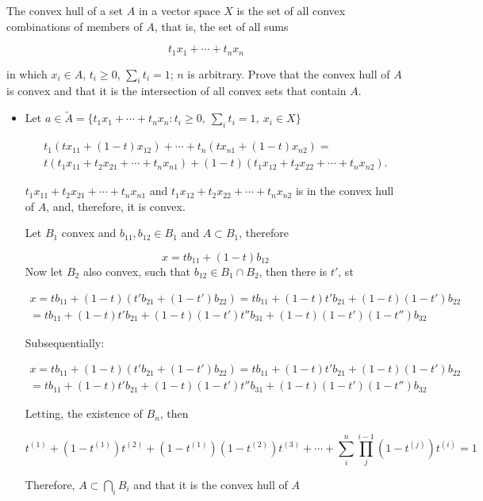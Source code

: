 The convex hull of a set $A$ in a vector space $X$ is the set of all convex combinations of members of $A$, that is, the set of all sums

$$t_1x_1+\cdots+t_nx_n$$

in which $x_i\in A$, $t_i\geq 0$, $\sum_i t_i=1$; $n$ is arbitrary. Prove that the convex hull of $A$ is convex and that it is the intersection of all convex sets that contain $A$.

\begin{itemize}
    \item Let $a\in\tilde{A}=\{t_1x_1+\cdots+t_nx_n : t_i\geq0, \ \sum_i t_i=1, \ x_i\in X\}$
    
    \begin{align*}
        t_1(tx_{11}+(1-t)x_{12})+\cdots+t_n(tx_{n1}+(1-t)x_{n2})=\\
        t(t_1x_{11}+t_2x_{21}+\cdots+t_nx_{n1})+(1-t)(t_1x_{12}+t_2x_{22}+\cdots+t_nx_{n2}).
    \end{align*}

    $t_1x_{11}+t_2x_{21}+\cdots+t_nx_{n1}$ and $t_1x_{12}+t_2x_{22}+\cdots+t_nx_{n2}$ is in the convex hull of $A$, and, therefore, it is convex.

    Let $B_1$ convex and $b_{11},b_{12}\in B_1$ and $A\subset B_1$, therefore

    $$
    x=tb_{11}+(1-t)b_{12}
    $$
    Now let $B_2$ also convex, such that $b_{12}\in B_1\cap B_2$, then there is $t'$, st

    \begin{align*}
        x=tb_{11}+(1-t)(t'b_{21}+(1-t')b_{22})=tb_{11}+(1-t)t'b_{21}+(1-t)(1-t')b_{22}\\
        =tb_{11}+(1-t)t'b_{21}+(1-t)(1-t')t''b_{31}+(1-t)(1-t')(1-t'')b_32
    \end{align*}

    Subsequentially:

    \begin{align*}
        x=tb_{11}+(1-t)(t'b_{21}+(1-t')b_{22})=tb_{11}+(1-t)t'b_{21}+(1-t)(1-t')b_{22}\\
        =tb_{11}+(1-t)t'b_{21}+(1-t)(1-t')t''b_{31}+(1-t)(1-t')(1-t'')b_32
    \end{align*}

    Letting, the existence of $B_n$, then

    $$
    t^{(1)}+(1-t^{(1)})t^{(2)}+(1-t^{(1)})(1-t^{(2)})t^{(3)}+ \cdots + \sum_i^n\prod_j^{i-1}(1-t^{(j)})t^{(i)}=1
    $$

    Therefore, $A\subset \bigcap_i B_i$ and that it is the convex hull of $A$

\end{itemize}
